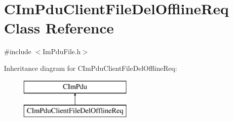 \hypertarget{class_c_im_pdu_client_file_del_offline_req}{}\section{C\+Im\+Pdu\+Client\+File\+Del\+Offline\+Req Class Reference}
\label{class_c_im_pdu_client_file_del_offline_req}


{\ttfamily \#include $<$Im\+Pdu\+File.\+h$>$}

Inheritance diagram for C\+Im\+Pdu\+Client\+File\+Del\+Offline\+Req\+:\begin{figure}[H]
\begin{center}
\leavevmode
\includegraphics[height=2.000000cm]{class_c_im_pdu_client_file_del_offline_req}
\end{center}
\end{figure}
